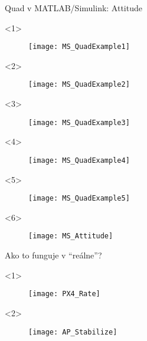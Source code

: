 \begin{frame}{Quad v MATLAB/Simulink: Attitude}
\begin{onlyenv}<1>
  \begin{figure}
\centering
\texttt{[image: MS\_QuadExample1]}\\
\end{figure}
\end{onlyenv}

\begin{onlyenv}<2>
\begin{figure}
\centering
\texttt{[image: MS\_QuadExample2]}\\
\end{figure}
\end{onlyenv}

\begin{onlyenv}<3>
\begin{figure}
\centering
\texttt{[image: MS\_QuadExample3]}\\
\end{figure}
\end{onlyenv}


\begin{onlyenv}<4>
\begin{figure}
\centering
\texttt{[image: MS\_QuadExample4]}\\
\end{figure}
\end{onlyenv}

\begin{onlyenv}<5>
\begin{figure}
\centering
\texttt{[image: MS\_QuadExample5]}\\
\end{figure}
\end{onlyenv}


\begin{onlyenv}<6>
\begin{figure}
\centering
\texttt{[image: MS\_Attitude]}\\
\end{figure}
\end{onlyenv}

\end{frame}


\begin{frame}{Ako to funguje v ``reálne''?}
\begin{onlyenv}<1>
  \begin{figure}
\centering
  \texttt{[image: PX4\_Rate]}\\
\end{figure}
\end{onlyenv}

\begin{onlyenv}<2>
  \begin{figure}
\centering
  \texttt{[image: AP\_Stabilize]}\\
\end{figure}
\end{onlyenv}


\end{frame} 


